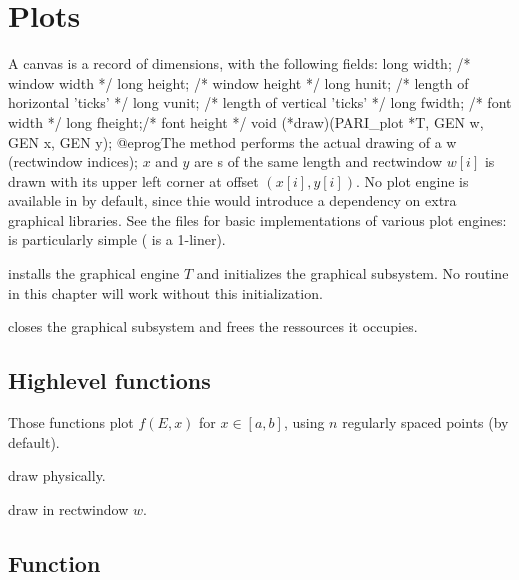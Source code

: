 



\newpage

\chapter{Plots}

A  canvas is a record of dimensions, with the following fields:
\bprog
  long width;  /* window width */
  long height; /* window height */
  long hunit;  /* length of horizontal 'ticks' */
  long vunit;  /* length of vertical 'ticks' */
  long fwidth; /* font width */
  long fheight;/* font height */
  void (*draw)(PARI_plot *T, GEN w, GEN x, GEN y);
@eprog\noindent The  method performs the actual drawing of
a  w (rectwindow indices); $x$ and $y$ are s
of the same length and rectwindow $w[i]$ is drawn with its upper left
corner at offset $(x[i],y[i])$. No plot engine is available in 
by default, since thie would introduce a dependency on extra graphical
libraries. See the files  for basic implementations of
various plot engines:  is particularly simple ( is a
1-liner).

 installs the
graphical engine $T$ and initializes the graphical subsystem. No routine in
this chapter will work without this initialization.

 closes the graphical subsystem and
frees the ressources it occupies.

\section{Highlevel functions}
Those functions plot $f(E,x)$ for $x\in [a,b]$, using $n$ regularly spaced
points (by default).

 draw physically.

 draw in rectwindow $w$.

\section{Function}

